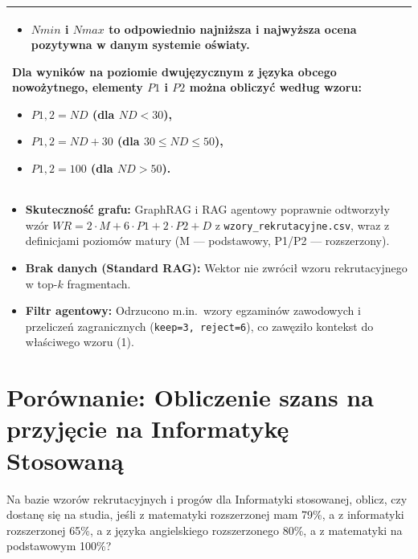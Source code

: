 \begin{tabularx}{\textwidth}{@{} >{\raggedright\arraybackslash}X >{\raggedright\arraybackslash}X >{\raggedright\arraybackslash}X @{}}
\begin{minipage}[t]{\linewidth}
\begin{itemize}
\item \( Nmin \) i \( Nmax \) to odpowiednio najniższa i najwyższa ocena pozytywna w danym systemie oświaty.
\end{itemize}
Dla wyników na poziomie dwujęzycznym z języka obcego nowożytnego, elementy \( P1 \) i \( P2 \) można obliczyć według wzoru:
\begin{itemize}
\item \( P1,2 = ND \) (dla \( ND < 30 \)),
\item \( P1,2 = ND + 30 \) (dla \( 30 \leq ND \leq 50 \)),
\item \( P1,2 = 100 \) (dla \( ND > 50 \)).
\end{itemize}\end{minipage} \\
    \bottomrule
\end{tabularx}

\begin{tcolorbox}[colback=green!5!white,colframe=green!50!black,title=Wnioski i obserwacje]
    \begin{itemize}
        \item \textbf{Skuteczność grafu:} GraphRAG i RAG agentowy poprawnie odtworzyły wzór $WR = 2 \cdot M + 6 \cdot P1 + 2 \cdot P2 + D$ z \texttt{wzory\_rekrutacyjne.csv}, wraz z definicjami poziomów matury (M --- podstawowy, P1/P2 --- rozszerzony).
        \item \textbf{Brak danych (Standard RAG):} Wektor nie zwrócił wzoru rekrutacyjnego w top-$k$ fragmentach.
        \item \textbf{Filtr agentowy:} Odrzucono m.in.\ wzory egzaminów zawodowych i przeliczeń zagranicznych (\texttt{keep=3, reject=6}), co zawęziło kontekst do właściwego wzoru (1).
    \end{itemize}
\end{tcolorbox}
\vspace{1em}

\newpage
\section*{Porównanie: Obliczenie szans na przyjęcie na Informatykę Stosowaną}

\begin{tcolorbox}[colback=blue!5!white,colframe=blue!75!black,title=Pytanie użytkownika]
    Na bazie wzorów rekrutacyjnych i progów dla Informatyki stosowanej, oblicz, czy dostanę się na studia, jeśli z matematyki rozszerzonej mam 79\%, a z informatyki rozszerzonej 65\%, a z języka angielskiego rozszerzonego 80\%, a z matematyki na podstawowym 100\%?
\end{tcolorbox}

